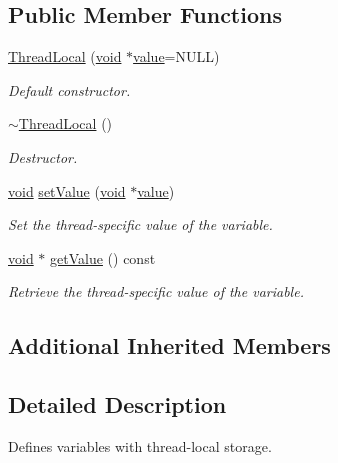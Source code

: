 \subsection*{Public Member Functions}
\begin{DoxyCompactItemize}
\item 
\hyperlink{classsf_1_1_thread_local_a44ea3c4be4eef118080275cbf4cf04cd}{Thread\-Local} (\hyperlink{glutf90_8h_ac778d6f63f1aaf8ebda0ce6ac821b56e}{void} $\ast$\hyperlink{gl3_8h_a8ad81492d410ff2ac11f754f4042150f}{value}=N\-U\-L\-L)
\begin{DoxyCompactList}\small\item\em Default constructor. \end{DoxyCompactList}\item 
\hyperlink{classsf_1_1_thread_local_acc612bddfd0f0507b1c5da8b3b8c75c2}{$\sim$\-Thread\-Local} ()
\begin{DoxyCompactList}\small\item\em Destructor. \end{DoxyCompactList}\item 
\hyperlink{glutf90_8h_ac778d6f63f1aaf8ebda0ce6ac821b56e}{void} \hyperlink{classsf_1_1_thread_local_ab7e334c83d77644a8e67ee31c3230007}{set\-Value} (\hyperlink{glutf90_8h_ac778d6f63f1aaf8ebda0ce6ac821b56e}{void} $\ast$\hyperlink{gl3_8h_a8ad81492d410ff2ac11f754f4042150f}{value})
\begin{DoxyCompactList}\small\item\em Set the thread-\/specific value of the variable. \end{DoxyCompactList}\item 
\hyperlink{glutf90_8h_ac778d6f63f1aaf8ebda0ce6ac821b56e}{void} $\ast$ \hyperlink{classsf_1_1_thread_local_aef35a39686eac4b6634a6e5605aacfd7}{get\-Value} () const 
\begin{DoxyCompactList}\small\item\em Retrieve the thread-\/specific value of the variable. \end{DoxyCompactList}\end{DoxyCompactItemize}
\subsection*{Additional Inherited Members}


\subsection{Detailed Description}
Defines variables with thread-\/local storage. 

